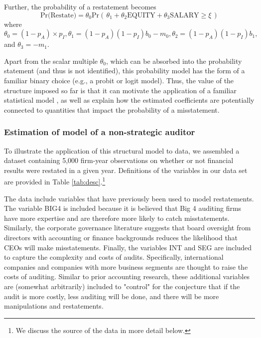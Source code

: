 Further, the probability of a restatement becomes
\begin{equation} \label{restate1}
\mbox{Pr(Restate)} = \theta_0 \mbox{Pr}\left(\, \theta_1 + \theta_2 \mbox{EQUITY} + \theta_3 \mbox{SALARY}  \ge \xi \,\right)
\end{equation}
where $\theta_0=(1-p_A) \times p_I, \theta_1 = (1 - p_A)(1 - p_I) b_0 - m_0, 
\theta_2 = (1 - p_A)(1 - p_I) b_1,$ and $\theta_3 = - m_1$. 

Apart from the scalar multiple $\theta_0$, which can be absorbed into the probability statement (and thus is not identified), this probability model has the form of  a familiar binary choice (e.g., a probit or logit model).
Thus, the value of the structure imposed so far is that it can motivate the application of a familiar statistical model \citep[as in][]{Efendi:2007ja}, as well as explain how the estimated coefficients are potentially connected to quantities that impact the probability of a misstatement.


\subsubsection{Estimation of model of a non-strategic auditor}
To illustrate the application of this structural model to data, we assembled a dataset containing 5,000 firm-year observations on whether or not financial results were restated in a given year.
Definitions of the variables in our data set are provided in Table \ref{tab:desc}.\footnote{
We discuss the source of the data in more detail below.}

The data include variables that have previously been used to model restatements.
The variable BIG4 is included because it is believed that Big 4 auditing firms have more expertise and are therefore more likely to catch misstatements. 
Similarly, the corporate governance literature suggests that board oversight from directors with accounting or finance backgrounds reduces the likelihood that CEOs will make misstatements. 
Finally, the variables INT and SEG are included to capture the complexity and costs of audits. 
Specifically, international companies and companies with more business segments are thought to raise the costs of auditing. Similar to prior accounting research, these additional variables are (somewhat arbitrarily) included to "control" for the conjecture that if the audit is more costly, less auditing will be done, and there will be more manipulations and restatements.

